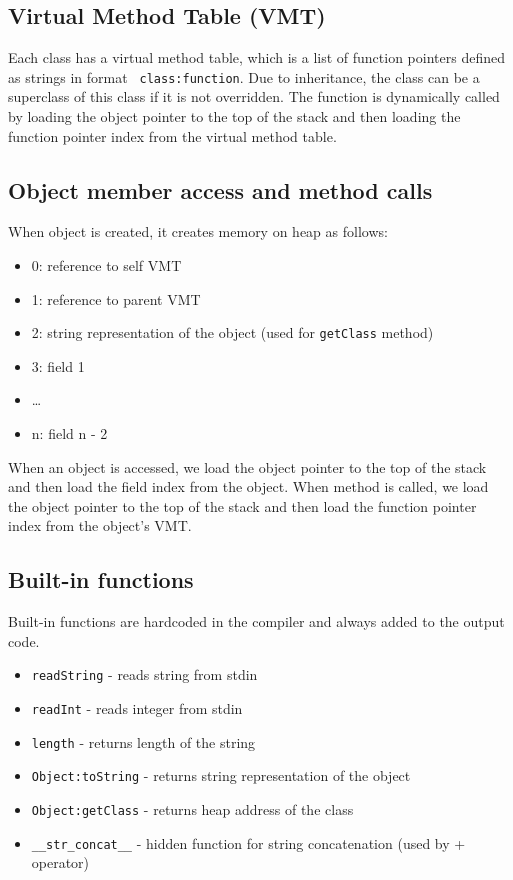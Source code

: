 \documentclass[a4paper,11pt]{article}
\begin{document}
                \subsection{Virtual Method Table (VMT)}
                    Each class has a virtual method table, which is a list of function pointers defined as strings in format \texttt{ class:function}.
                    Due to inheritance, the class can be a superclass of this class if it is not overridden.
                    The function is dynamically called by loading the object pointer to the top of the stack and then loading the function pointer index from the virtual method table.


                \subsection{Object member access and method calls}
                    When object is created, it creates memory on heap as follows:
                    \begin{itemize}
                        \item 0: reference to self VMT
                        \item 1: reference to parent VMT
                        \item 2: string representation of the object (used for \texttt{getClass} method)
                        \item 3: field 1
                        \item \ldots
                        \item n: field n - 2
                    \end{itemize}
                    When an object is accessed, we load the object pointer to the top of the stack and then load the field index from the object.
                    When method is called, we load the object pointer to the top of the stack and then load the function pointer index from the object's VMT.

                \subsection{Built-in functions}
                    Built-in functions are hardcoded in the compiler and always added to the output code.
                    \begin{itemize}
                        \item \texttt{readString} - reads string from stdin
                        \item \texttt{readInt} - reads integer from stdin
                        \item \texttt{length} - returns length of the string
                        \item \texttt{Object:toString} - returns string representation of the object
                        \item \texttt{Object:getClass} - returns heap address of the class
                        \item \texttt{\_\_str\_concat\_\_} - hidden function for string concatenation (used by + operator)
                    \end{itemize}
\end{document}
